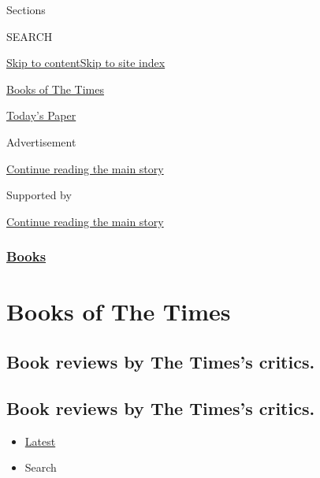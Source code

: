 Sections

SEARCH

\protect\hyperlink{site-content}{Skip to
content}\protect\hyperlink{site-index}{Skip to site index}

\href{https://www.nytimes3xbfgragh.onion/column/books-of-the-times}{Books
of The Times}

\href{https://myaccount.nytimes3xbfgragh.onion/auth/login?response_type=cookie\&client_id=vi}{}

\href{https://www.nytimes3xbfgragh.onion/section/todayspaper}{Today's
Paper}

Advertisement

\protect\hyperlink{after-top}{Continue reading the main story}

Supported by

\protect\hyperlink{after-sponsor}{Continue reading the main story}

\hypertarget{books}{%
\subsubsection{\texorpdfstring{\href{/section/books}{Books}}{Books}}\label{books}}

\hypertarget{books-of-the-times}{%
\section{Books of The Times}\label{books-of-the-times}}

\hypertarget{book-reviews-by-the-timess-critics}{%
\subsection{Book reviews by The Times's
critics.}\label{book-reviews-by-the-timess-critics}}

\hypertarget{book-reviews-by-the-timess-critics-1}{%
\subsection{Book reviews by The Times's
critics.}\label{book-reviews-by-the-timess-critics-1}}

\begin{itemize}
\tightlist
\item
  \protect\hyperlink{stream-panel}{Latest}
\item
  Search
\end{itemize}

